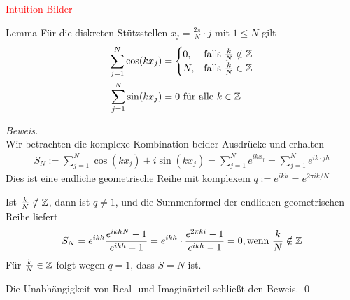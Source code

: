\textcolor{red}{Intuition Bilder}

\begin{colbox}{Lemma}\label{lem:diskStstelSum}
  Für die diskreten Stützstellen $x_j=\tfrac{2\pi}{N}\cdot j$ mit $1\leq N$  gilt
  \begin{align*}
    \sum_{j=1}^N \cos(kx_j) 
    &= \begin{cases}
      0, & \text{falls } \tfrac{k}{N}\notin\mathbb Z \\
      N, & \text{falls } \tfrac{k}{N}\in\mathbb Z
    \end{cases} \\
    \sum_{j=1}^N \sin(kx_j) 
    &= 0 \text{ für alle } k\in\mathbb Z
  \end{align*}
\end{colbox}

\textit{Beweis.}\\
Wir betrachten die komplexe Kombination beider Ausdrücke und erhalten
%
\begin{align*}
  S_N := \sum_{j=1}^{N} \cos(kx_j) + i\sin(kx_j) = \sum_{j=1}^{N} e^{ikx_j} = \sum_{j=1}^{N} e^{ik\cdot jh}
\end{align*}%
Dies ist eine endliche geometrische Reihe mit komplexem $q := e^{ikh} = e^{2\pi ik/N}$

Ist $\tfrac{k}{N}\notin\mathbb Z$, dann ist $q\neq 1$, und die Summenformel der endlichen geometrischen Reihe liefert 
%
\begin{align*}
   S_N 
   = e^{ikh}\dfrac{e^{ikhN}-1}{e^{ikh}-1} 
   = e^{ikh}\cdot\dfrac{e^{2\pi ki}-1}{e^{ikh}-1} 
   = 0, \text{wenn } \dfrac{k}{N}\notin\mathbb Z
\end{align*}
%
Für $\tfrac{k}{N}\in\mathbb Z$ folgt wegen $q=1$, dass $S=N$ ist. 

Die Unabhängigkeit von Real- und Imaginärteil schließt den Beweis.
\qed


